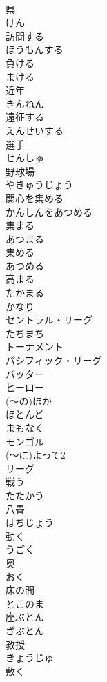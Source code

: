 \documentclass[8pt]{extreport}
\begin{document}
\begin{CJK}{UTF8}{min}
\\	県	
\\	けん
\\	訪問する	
\\	ほうもんする
\\	負ける	
\\	まける
\\	近年	
\\	きんねん
\\	遠征する	
\\	えんせいする
\\	選手	
\\	せんしゅ
\\	野球場	
\\	やきゅうじょう
\\	関心を集める	
\\	かんしんをあつめる
\\	集まる	
\\	あつまる
\\	集める	
\\	あつめる
\\	高まる	
\\	たかまる
\\	かなり	
\\	セントラル・リーグ	
\\	たちまち	
\\	トーナメント	
\\	パシフィック・リーグ	
\\	バッター	
\\	ヒーロー	
\\	(～の)ほか	
\\	ほとんど	
\\	まもなく	
\\	モンゴル	
\\	(～に)よって2	
\\	リーグ	
\\	戦う	
\\	たたかう
\\	八畳	
\\	はちじょう
\\	動く	
\\	うごく
\\	奥	
\\	おく
\\	床の間	
\\	とこのま
\\	座ぶとん	
\\	ざぶとん
\\	教授	
\\	きょうじゅ
\\	敷く	

\end{CJK}
\end{document}
